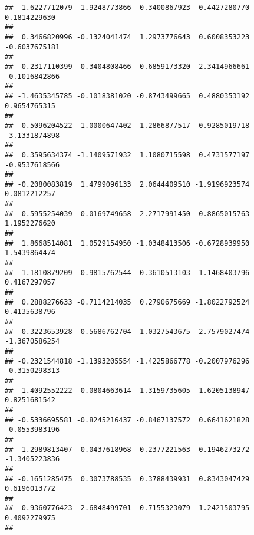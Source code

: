 \documentclass[]{article}
\begin{document}
\begin{verbatim}
##  1.6227712079 -1.9248773866 -0.3400867923 -0.4427280770  0.1814229630 
##                                                                       
##  0.3466820996 -0.1324041474  1.2973776643  0.6008353223 -0.6037675181 
##                                                                       
## -0.2317110399 -0.3404808466  0.6859173320 -2.3414966661 -0.1016842866 
##                                                                       
## -1.4635345785 -0.1018381020 -0.8743499665  0.4880353192  0.9654765315 
##                                                                       
## -0.5096204522  1.0000647402 -1.2866877517  0.9285019718 -3.1331874898 
##                                                                       
##  0.3595634374 -1.1409571932  1.1080715598  0.4731577197 -0.9537618566 
##                                                                       
## -0.2080083819  1.4799096133  2.0644409510 -1.9196923574  0.0812212257 
##                                                                       
## -0.5955254039  0.0169749658 -2.2717991450 -0.8865015763  1.1952276620 
##                                                                       
##  1.8668514081  1.0529154950 -1.0348413506 -0.6728939950  1.5439864474 
##                                                                       
## -1.1810879209 -0.9815762544  0.3610513103  1.1468403796  0.4167297057 
##                                                                       
##  0.2888276633 -0.7114214035  0.2790675669 -1.8022792524  0.4135638796 
##                                                                       
## -0.3223653928  0.5686762704  1.0327543675  2.7579027474 -1.3670586254 
##                                                                       
## -0.2321544818 -1.1393205554 -1.4225866778 -0.2007976296 -0.3150298313 
##                                                                       
##  1.4092552222 -0.0804663614 -1.3159735605  1.6205138947  0.8251681542 
##                                                                       
## -0.5336695581 -0.8245216437 -0.8467137572  0.6641621828 -0.0553983196 
##                                                                       
##  1.2989813407 -0.0437618968 -0.2377221563  0.1946273272 -1.3405223836 
##                                                                       
## -0.1651285475  0.3073788535  0.3788439931  0.8343047429  0.6196013772 
##                                                                       
## -0.9360776423  2.6848499701 -0.7155323079 -1.2421503795  0.4092279975 
##                                                                       

\end{verbatim}
\end{document}
